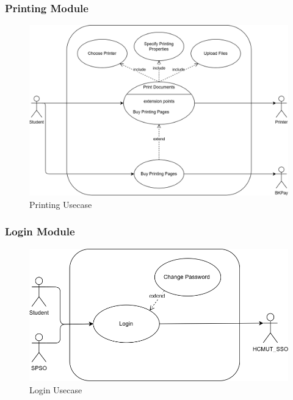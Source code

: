 \subsubsection{Printing Module}
\begin{figure}[htbp]
	\centering
	\includegraphics[width=1.0\textwidth]{Images/Usecases/Print_usecase.png}
	\vspace{15pt}
	\caption{\fontsize{12pt}{0pt}\selectfont Printing Usecase}
\end{figure}
\newpage

\subsubsection{Login Module}
\begin{figure}[htbp]
	\centering
	\includegraphics[width=1.0\textwidth]{Images/Usecases/Login_usecase.png}
	\vspace{15pt}
	\caption{\fontsize{12pt}{0pt}\selectfont Login Usecase}
\end{figure}
\newpage

